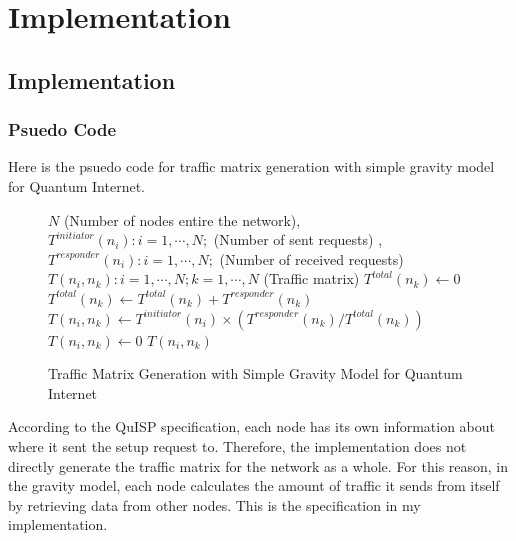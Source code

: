 \chapter{Implementation}
\label{implementation}

\section{Implementation}

\subsection{Psuedo Code}
Here is the psuedo code for traffic matrix generation with simple gravity model for Quantum Internet.

\begin{figure}[H]
  \begin{algorithm}[H]
    \caption{Traffic Matrix Generation with Simple Gravity Model for Quantum Internet}
    \label{alg1}
    \begin{algorithmic}
      \Require 
      $N$ (Number of nodes entire the network), \\
      $T^{initiator}(n_i) : i = 1, \cdots, N;$ (Number of sent requests) ,\\
      $T^{responder}(n_i) : i = 1, \cdots, N;$ (Number of received requests)
      \Ensure $T(n_i, n_k) : i = 1, \cdots, N; k = 1, \cdots, N$ (Traffic matrix)
        \State $T^{total}(n_k) \leftarrow 0$
            \State $T^{total}(n_k) \leftarrow T^{total}(n_k) + T^{responder}(n_k)$
          \EndIf
        \EndFor
            \State $T(n_i, n_k) \leftarrow T^{initiator}(n_i) \times (T^{responder}(n_k) / T^{total}(n_k))$
          \Else
            \State $T(n_i, n_k) \leftarrow 0$
          \EndIf
        \EndFor
      \EndFor
      \State \Return $T(n_i, n_k)$
    \end{algorithmic}
  \end{algorithm}
\end{figure}

According to the QuISP specification, each node has its own information about where it sent the setup request to.
Therefore, the implementation does not directly generate the traffic matrix for the network as a whole.
For this reason, in the gravity model, each node calculates the amount of traffic it sends from itself by retrieving data from other nodes. 
This is the specification in my implementation.

